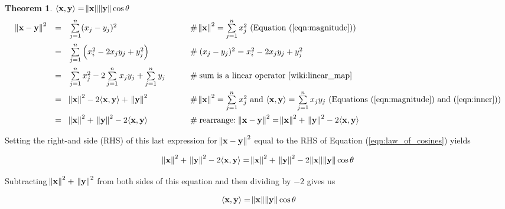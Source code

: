 \documentclass{article}
\theoremstyle{definition}
\newtheorem{theorem}{Theorem}[section]
\begin{document}
\begin{theorem} {$\langle \mathbf{x}, \mathbf{y} \rangle = 
\norm{\mathbf{x}} \norm{\mathbf{y}}\cos \theta$}
\begin{equation*}
\begin{array}{lllll}
{\norm{\mathbf{x} - \mathbf{y}}}^2
&=& \sum\limits_{j = 1}^{n} (x_j - y_j)^2
		&\hspace{2em} \mathrel{\#} \text{${\norm{\mathbf{x}}}^2 = \sum\limits_{j = 
					1}^{n} {x}^{2}_{j}$ (Equation (\ref{eqn:magnitude}))}\\
[12pt]
&=& \sum\limits_{j = 1}^{n} \left ( x_{i}^{2} - 2 x_{j} y _{j} + y_{j}^{2} \right )
		&\hspace{2em} \mathrel{\#} (x_j - y_j)^2 = x_{i}^{2} - 2 x_{j} y _{j} + y_{j}^{2} \\
[12pt]
&=& \sum\limits_{j = 1}^{n} x_j ^2 - 2 \sum\limits_{j = 1}^{n} x_j y_j + \sum\limits_{j = 1}^{n} y_j
		&\hspace{2em} \mathrel{\#} \text{sum is a linear operator \cite{wiki:linear_map}} \\
[12pt]
&=& {\norm{\mathbf{x}}}^2 - 2  \langle \mathbf{x} , \mathbf{y} \rangle + \; {\norm{\mathbf{y}}}^2 
 		&\hspace{2em} \mathrel{\#} \text{${\norm{\mathbf{x}}}^2 = \sum\limits_{j = 1}^{n} {x}^{2}_{j}$ 
					and $\langle \mathbf{x},\mathbf{y} \rangle  = \sum\limits_{j =  1}^{n} x_{j} y_{j}$ 
					(Equations (\ref{eqn:magnitude}) and (\ref{eqn:inner}))} \\
[12pt]
&=& {\norm{\mathbf{x}}}^2 + \; {\norm{\mathbf{y}}}^2 - 2  \langle \mathbf{x} , \mathbf{y} \rangle
 		&\hspace{2em} \mathrel{\#} \text{rearrange: ${\norm{\mathbf{x} - \mathbf{y}}}^2 = 
					{\norm{\mathbf{x}}}^2 + \; {\norm{\mathbf{y}}}^2 - 2  \langle \mathbf{x} , 
					\mathbf{y} \rangle$}
\end{array}
\end{equation*}

\bigskip
\noindent
Setting the right-and side (RHS) of this last expression for 
${\norm{\mathbf{x} - \mathbf{y}}}^2$ equal to the RHS of Equation 
(\ref{eqn:law_of_cosines}) yields


\medskip
\begin{equation*}
{\norm{\mathbf{x}}}^2 + \; {\norm{\mathbf{y}}}^2 - 2 \langle \mathbf{x},\mathbf{y} \rangle
=
{\norm{\mathbf{x}}}^2 + \; {\norm{\mathbf{y}}}^2 - 2 \norm{\mathbf{x}} \norm{\mathbf{y}} \cos \theta
\end{equation*}


\bigskip
\noindent
Subtracting ${\norm{\mathbf{x}}}^2 + \; {\norm{\mathbf{y}}}^2$ from both sides
of this equation and then dividing by $-2$ gives us

\medskip
\begin{equation*}
\langle \mathbf{x}, \mathbf{y} \rangle = 
\norm{\mathbf{x}} \norm{\mathbf{y}} \cos \theta
\end{equation*}
\end{theorem}
\end{document}
